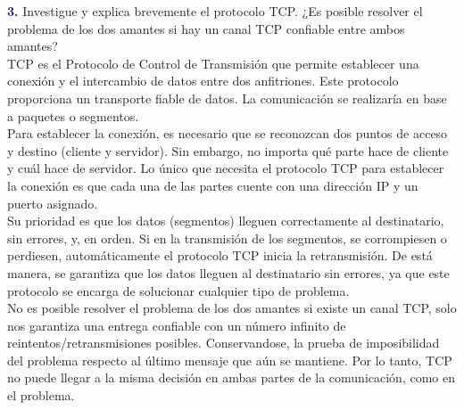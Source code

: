 \newpage
\textbf{\textcolor{MidnightBlue}{3.}} Investigue y explica brevemente el protocolo TCP.
¿Es posible resolver el problema de los dos amantes
si hay un canal TCP confiable entre ambos amantes?\\

TCP es el Protocolo de Control de Transmisión que permite establecer una
conexión y el intercambio de datos entre dos anfitriones. Este protocolo
proporciona un transporte fiable de datos. La comunicación se realizaría en
base a paquetes o segmentos.\\

Para establecer la conexión, es necesario que se reconozcan dos puntos de
acceso y destino (cliente y servidor). Sin embargo, no importa qué parte
hace de cliente y cuál hace de servidor. Lo único que necesita el protocolo
TCP para establecer la conexión es que cada una de las partes cuente con una
dirección IP y un puerto asignado.\\

Su prioridad es que los datos (segmentos) lleguen correctamente al destinatario,
sin errores, y, en orden. Si en la transmisión de los segmentos, se corrompiesen
o perdiesen, automáticamente el protocolo TCP inicia la retransmisión. De está
manera, se garantiza que los datos lleguen al destinatario sin errores,
ya que este protocolo se encarga de solucionar cualquier tipo de problema.\\

No es posible resolver el problema de los dos amantes si existe un canal TCP,
solo nos garantiza una entrega confiable con un número infinito de
reintentos/retransmisiones posibles. Conservandose, la prueba de imposibilidad
del problema respecto al último mensaje que aún se mantiene. Por lo tanto,
TCP no puede llegar a la misma decisión en ambas partes de la comunicación,
como en el problema.
